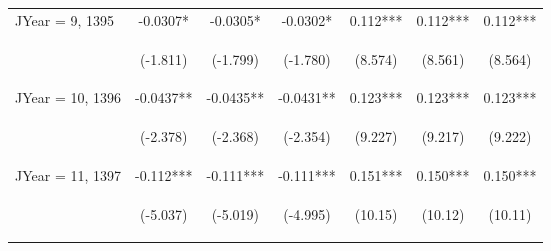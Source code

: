 \documentclass[]{article}
\begin{document}
\begin{center}
\begin{tabular}{lcccccc}
JYear = 9, 1395 & -0.0307* & -0.0305* & -0.0302* & 0.112*** & 0.112*** & 0.112*** \\
\vspace{4pt} & \begin{footnotesize}(-1.811)\end{footnotesize} & \begin{footnotesize}(-1.799)\end{footnotesize} & \begin{footnotesize}(-1.780)\end{footnotesize} & \begin{footnotesize}(8.574)\end{footnotesize} & \begin{footnotesize}(8.561)\end{footnotesize} & \begin{footnotesize}(8.564)\end{footnotesize} \\
JYear = 10, 1396 & -0.0437** & -0.0435** & -0.0431** & 0.123*** & 0.123*** & 0.123*** \\
\vspace{4pt} & \begin{footnotesize}(-2.378)\end{footnotesize} & \begin{footnotesize}(-2.368)\end{footnotesize} & \begin{footnotesize}(-2.354)\end{footnotesize} & \begin{footnotesize}(9.227)\end{footnotesize} & \begin{footnotesize}(9.217)\end{footnotesize} & \begin{footnotesize}(9.222)\end{footnotesize} \\
JYear = 11, 1397 & -0.112*** & -0.111*** & -0.111*** & 0.151*** & 0.150*** & 0.150*** \\
\vspace{4pt} & \begin{footnotesize}(-5.037)\end{footnotesize} & \begin{footnotesize}(-5.019)\end{footnotesize} & \begin{footnotesize}(-4.995)\end{footnotesize} & \begin{footnotesize}(10.15)\end{footnotesize} & \begin{footnotesize}(10.12)\end{footnotesize} & \begin{footnotesize}(10.11)\end{footnotesize} \\

\end{tabular}
\end{center}
\end{document}
